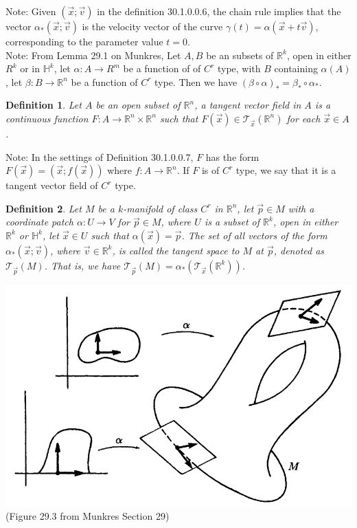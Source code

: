 \documentclass[15pt]{book}
\theoremstyle{break}
\theoremstyle{break}
\newtheorem{defn}{Definition}[corL]
\newcommand{\R}{\mathbb{R}}
\newcommand{\T}{\mathcal{T}}
\newcommand{\note}{\color{red}Note: \color{black}}
\begin{document}
\note Given $(\vec{x}; \vec{v})$ in the definition 30.1.0.0.6, the chain rule implies that the vector $\alpha_*(\vec{x};\vec{v})$ is the velocity vector of the curve $\gamma(t) = \alpha(\vec{x}+t\vec{v})$, corresponding to the parameter value $t = 0$.\\

\note From Lemma 29.1 on Munkres, Let $A,B$ be an subsets of $\R^k$, open in either $R^k$ or in $\mathbb{H}^k$, let $\alpha :A \to R^m$ be a function of of $C^r$ type, with $B$ containing $\alpha(A)$, let $\beta:B \to \R^n$ be a function of $C^r$ type. Then we have $(\beta\circ \alpha)_* = \beta_* \circ \alpha_*$.\\

\begin{defn}
Let $A$ be an open subset of $\R^n$, a tangent vector field in $A$ is a continuous function $F:A \to \R^n \times \R^n$ such that $F(\vec{x}) \in \T_{\vec{x}}(\R^n)$ for each $\vec{x}\in A$. 
\end{defn}

\note In the settings of Definition 30.1.0.0.7, $F$ has the form $F(\vec{x}) = (\vec{x};f(\vec{x}))$ where $f :A \to \R^n$. If $F$ is of $C^r$ type, we say that it is a tangent vector field of $C^r$ type. 

\begin{defn}
Let $M$ be a $k$-manifold of class $C^r$ in $\R^n$, let $\vec{p}\in M$ with a coordinate patch $\alpha: U \to V$ for $\vec{p} \in M$, where $U$ is a subset of $\R^k$, open in either $\R^k$ or $\mathbb{H}^k$, let $\vec{x}\in U$ such that $\alpha(\vec{x})  = \vec{p}$. The set of all vectors of the form $\alpha_*(\vec{x}; \vec{v})$, where $\vec{v}\in \R^k$, is called the tangent space to $M$ at $\vec{p}$, denoted as $\T_{\vec{p}}(M)$. That is, we have $\T_{\vec{p}}(M) = \alpha_*(\T_{\vec{x}}(\R^k))$. 
\end{defn}

\begin{center}
\includegraphics[scale=0.45]{mtangent.png}\\
(Figure 29.3 from Munkres Section 29)
\end{center}
\end{document}
